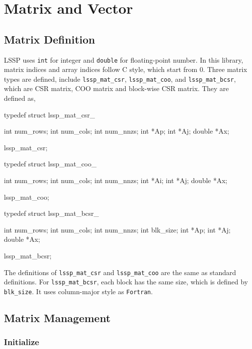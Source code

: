 
\chapter{Matrix and Vector}

\section{Matrix Definition}

LSSP uses \verb|int| for integer and \verb|double| for floating-point number.
In this library, matrix indices and array indices follow C style, which start from 0.
Three matrix types are defined, include \verb|lssp_mat_csr|, \verb|lssp_mat_coo|,
     and \verb|lssp_mat_bcsr|, which are CSR matrix, COO matrix and block-wise
     CSR matrix. They are defined as,

\begin{evb}
typedef struct lssp_mat_csr_
{
    int num_rows;
    int num_cols;
    int num_nnzs;
    int *Ap;
    int *Aj;
    double *Ax;

} lssp_mat_csr;
\end{evb}

\begin{evb}
typedef struct lssp_mat_coo_
{
    int num_rows;
    int num_cols;
    int num_nnzs;
    int *Ai;
    int *Aj;
    double *Ax;

} lssp_mat_coo;
\end{evb}

\begin{evb}
typedef struct lssp_mat_bcsr_
{
    int num_rows;
    int num_cols;
    int num_nnzs;
    int blk_size;
    int *Ap;
    int *Aj;
    double *Ax;

} lssp_mat_bcsr;
\end{evb}

The definitions of \verb|lssp_mat_csr| and \verb|lssp_mat_coo| are the same as standard 
definitions. For \verb|lssp_mat_bcsr|, each block has the same size, which is defined by
\verb|blk_size|. It uses column-major style as \verb|Fortran|.


\section{Matrix Management}

\subsection{Initialize}

